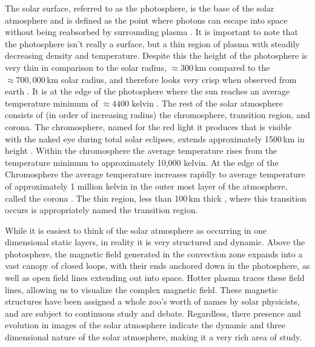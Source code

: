 The solar surface, referred to as the photosphere, is the base of the solar atmosphere and is defined as the point where photons can escape into space without being reabsorbed by surrounding plasma \citep{Priest2014}.
It is important to note that the photosphere isn't really a surface, but a thin region of plasma with steadily decreasing density and temperature.
Despite this the height of the photosphere is very thin in comparison to the solar radius, $\approx300$\,km compared to the $\approx700,000$\,km solar radius, and therefore looks very crisp when observed from earth \citep{JudgeBook}.
It is at the edge of the photosphere where the sun reaches an average temperature minimum of $\approx4400$ kelvin \citep{SolarPhysicsOverview}.
The rest of the solar atmosphere consists of (in order of increasing radius) the chromosphere, transition region, and corona.
The chromosphere, named for the red light it produces that is visible with the naked eye during total solar eclipses, extends approximately 1500\,km in height \citep{SolarPhysicsOverview}.
Within the chromosphere the average temperature rises from the temperature minimum to approximately 10,000  kelvin.
At the edge of the Chromosphere the average temperature increases rapidly to average temperature of approximately 1 million kelvin in the outer most layer of the atmosphere, called the corona \citep{SolarPhysicsOverview}.
The thin region, less than 100\,km thick \citep{Priest2014}, where this transition occurs is appropriately named the transition region.

While it is easiest to think of the solar atmosphere as occurring in one dimensional static layers, in reality it is very structured and dynamic.
Above the photosphere, the magnetic field generated in the convection zone expands into a vast canopy of closed loops, with their ends anchored down in the photosphere, as well as open field lines extending out into space.
Hotter plasma traces these field lines, allowing us to visualize the complex magnetic field.
These magnetic structures have been assigned a whole zoo's worth of names by solar physicists, and are subject to continuous study and debate.
Regardless, there presence and evolution in images of the solar atmosphere indicate the dynamic and three dimensional nature of the solar atmosphere, making it a very rich area of study.


